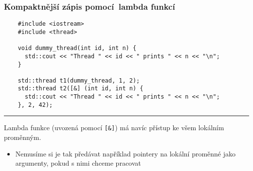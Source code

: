 \documentclass[usenames,dvipsnames,9pt]{beamer}
\begin{document}
\begin{frame}[fragile]
  \frametitle{Kompaktnější zápis pomocí lambda funkcí}
  \begin{verbatim}
    #include <iostream>
    #include <thread>

    void dummy_thread(int id, int n) {
      std::cout << "Thread " << id << " prints " << n << "\n";
    }

    std::thread t1(dummy_thread, 1, 2);
    std::thread t2([&] (int id, int n) {
      std::cout << "Thread " << id << " prints " << n << "\n";
    }, 2, 42);
  \end{verbatim}

  \vspace{1em}\hrule\vspace{1em}

  Lambda funkce (uvozená pomocí \texttt{[&]}) má navíc přístup ke všem lokálním proměnným.
  \begin{itemize}
    \item Nemusíme si je tak předávat například pointery na lokální proměnné jako argumenty, pokud s nimi chceme pracovat
  \end{itemize}
\end{frame}

  
    
\end{document}
